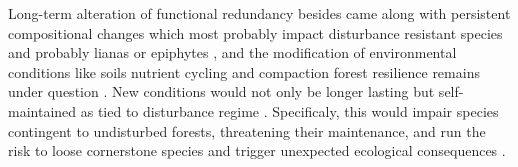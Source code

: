 \documentclass[fleqn,10pt]{ArtEcoFoG} %
\theoremstyle{definition}
\theoremstyle{definition}
\theoremstyle{definition}
\theoremstyle{remark}
\begin{document}
Long-term alteration of functional redundancy besides came along with
persistent compositional changes which most probably impact disturbance
resistant species \citep{Haddad2008} and probably lianas or epiphytes
\citep{Martin2013}, and the modification of environmental conditions
like soils nutrient cycling and compaction \citep{Olander2005} forest
resilience remains under question \citep{Chazdon2003a}. New conditions
would not only be longer lasting but self-maintained as tied to
disturbance regime \citep{Burslem2000}. Specificaly, this would impair
species contingent to undisturbed forests, threatening their
maintenance, and run the risk to loose cornerstone species and trigger
unexpected ecological consequences
\citep{Jones1994, Diaz2005, Gardner2007}.





\end{document}
